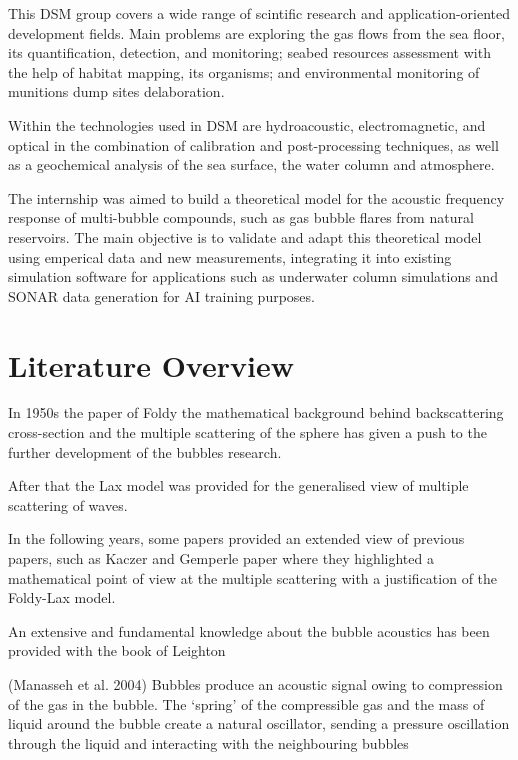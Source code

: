 This DSM group covers a wide range of scintific research and application-oriented development fields. Main problems are exploring the gas flows from the sea floor, its quantification, detection, and monitoring; seabed resources assessment with the help of habitat mapping, its organisms; and environmental monitoring of munitions dump sites delaboration\cite{noauthor_deepsea_nodate}.

Within the technologies used in DSM are hydroacoustic, electromagnetic, and optical in the combination of calibration and post-processing techniques, as well as a geochemical analysis of the sea surface, the water column and atmosphere.

The internship was aimed to build a theoretical model for the acoustic frequency response of multi-bubble compounds, such as gas bubble flares from natural reservoirs. The main objective is to validate and adapt this theoretical model using emperical data and new measurements, integrating it into existing simulation software for applications such as underwater column simulations and SONAR data generation for AI training purposes.



\section{Literature Overview} 

In 1950s the paper of Foldy the mathematical background behind backscattering cross-section and the multiple scattering of the sphere has given a push to the further development of the bubbles research.

After that the Lax model was provided \cite[]{lax_multiple_1951} for the generalised view of multiple scattering of waves.

In the following years, some papers provided an extended view of previous papers, such as Kaczer and Gemperle paper \cite[.]{kaczer_bubble_1977} where they highlighted a mathematical point of view at the multiple scattering with a justification of the Foldy-Lax model.

An extensive and fundamental knowledge about the bubble acoustics has been provided with the book of Leighton \cite[]{leighton_acoustic_2012}

(Manasseh et al. 2004\cite{manasseh_anisotropy_2004}) Bubbles produce an acoustic signal owing to compression of the gas in the bubble. The ‘spring’ of the compressible gas and the mass of liquid around the bubble create a natural oscillator, sending a pressure oscillation through the liquid and interacting with the neighbouring bubbles

